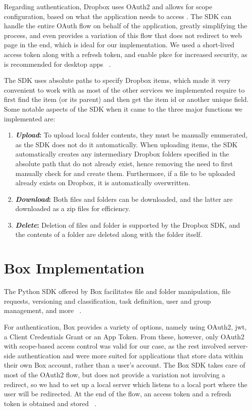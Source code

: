 Regarding authentication, Dropbox uses OAuth2 and allows for scope configuration, based on what the application needs to access . The SDK can handle the entire OAuth flow on behalf of the application, greatly simplifying the process, and even provides a variation of this flow that does not redirect to web page in the end, which is ideal for our implementation.  We used a short-lived access token along with a refresh token, and enable \ac{pkce} for increased security, as is recommended for desktop apps ~\cite{dropbox_oauth}.

The SDK uses absolute paths to specify Dropbox items, which made it very convenient to work with as most of the other services we implemented require to first find the item (or its parent) and then get the item id or another unique field. Some notable aspects of the SDK when it came to the three major functions we implemented are: ~\cite{dropbox_docs}

\begin{enumerate}
    \item \textbf{\textit{Upload}:} To upload local folder contents, they must be manually enumerated, as the SDK does not do it automatically. When uploading items, the SDK automatically creates any intermediary Dropbox folders specified in the absolute path that do not already exist, hence removing the need to first manually check for and create them. Furthermore, if a file to be uploaded already exists on Dropbox, it is automatically overwritten.

    \item \textbf{\textit{Download}:} Both files and folders can be downloaded, and the latter are downloaded as a zip files for efficiency.

    \item \textbf{\textit{Delete}:} Deletion of files and folder is supported by the Dropbox SDK, and the contents of a folder are deleted along with the folder itself.
\end{enumerate}


\section{Box Implementation}
The Python SDK offered by Box facilitates file and folder manipulation, file requests, versioning and classification, task definition, user and group management, and more ~\cite{box_docs}. 

For authentication, Box provides a variety of options, namely using OAuth2, \ac{jwt}, a Client Credentials Grant or an App Token. From these, however, only OAuth2 with scope-based access control was valid for our case, as the rest involved server-side authentication and were more suited for applications that store data within their own Box account, rather than a user's account.  The Box SDK takes care of most of the OAuth2 flow, but does not provide a variation not involving a redirect, so we had to set up a local server which listens to a local port where the user will be redirected. At the end of the flow, an access token and a refresh token is obtained and stored ~\cite{box_auth}.

